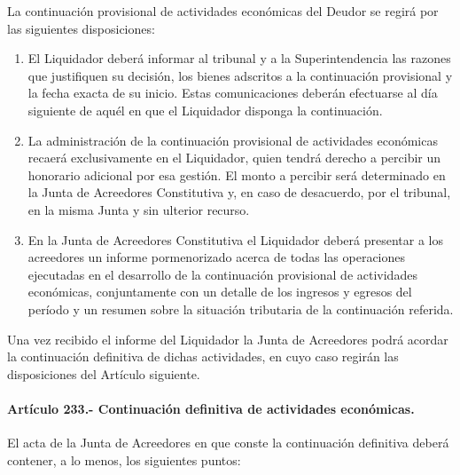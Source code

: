\documentclass[
]{book}
\begin{document}
La continuación provisional de actividades económicas del Deudor se regirá por las siguientes disposiciones:

\begin{enumerate}
\def\labelenumi{\arabic{enumi})}
\item
  El Liquidador deberá informar al tribunal y a la Superintendencia las razones que justifiquen su decisión, los bienes adscritos a la continuación provisional y la fecha exacta de su inicio. Estas comunicaciones deberán efectuarse al día siguiente de aquél en que el Liquidador disponga la continuación.
\item
  La administración de la continuación provisional de actividades económicas recaerá exclusivamente en el Liquidador, quien tendrá derecho a percibir un honorario adicional por esa gestión. El monto a percibir será determinado en la Junta de Acreedores Constitutiva y, en caso de desacuerdo, por el tribunal, en la misma Junta y sin ulterior recurso.
\item
  En la Junta de Acreedores Constitutiva el Liquidador deberá presentar a los acreedores un informe pormenorizado acerca de todas las operaciones ejecutadas en el desarrollo de la continuación provisional de actividades económicas, conjuntamente con un detalle de los ingresos y egresos del período y un resumen sobre la situación tributaria de la continuación referida.
\end{enumerate}

Una vez recibido el informe del Liquidador la Junta de Acreedores podrá acordar la continuación definitiva de dichas actividades, en cuyo caso regirán las disposiciones del Artículo siguiente.

\hypertarget{artuxedculo-233.--continuaciuxf3n-definitiva-de-actividades-econuxf3micas.}{%
\paragraph*{Artículo 233.- Continuación definitiva de actividades económicas.}\label{artuxedculo-233.--continuaciuxf3n-definitiva-de-actividades-econuxf3micas.}}

El acta de la Junta de Acreedores en que conste la continuación definitiva deberá contener, a lo menos, los siguientes puntos:
\end{document}
